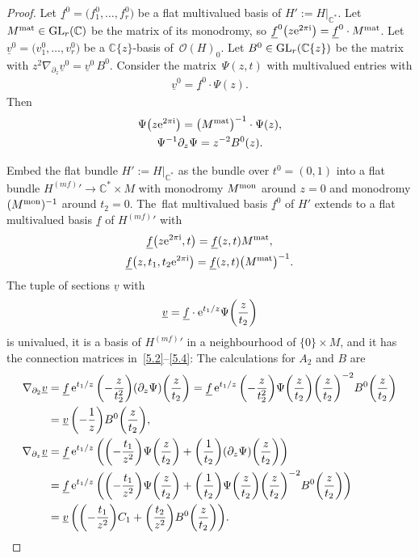 \documentclass[pdftex]{sigma}%
\numberwithin{equation}{section}
\numberwithin{figure}{section}
\newcommand{\C}{{\mathbb C}}
\newcommand{\OO}{{\mathcal O}}
\newcommand{\uuuu}{\underline}
\newcommand{\paa}{\partial}
\newcommand{\nnn}{\nabla}
\begin{document}
\begin{proof}
Let $\uuuu{f}^0=\big(f_1^0,\dots ,f_r^0\big)$ be a flat multivalued basis
of $H':=H|_{\C^*}$. Let $M^{\rm mat}\in {\rm GL}_r(\C)$
be the matrix of its monodromy, so
$\uuuu{f}^0\big(z {\rm e}^{2\pi {\rm i}}\big)=\uuuu{f}^0\cdot M^{\rm mat}$.
Let $\uuuu{v}^0=\big(v_1^0,\dots ,v_r^0\big)$ be a $\C\{z\}$-basis
of~$\OO(H)_0$. Let $B^0\in {\rm GL}_r(\C\{z\})$ be the matrix
with $z^2\nnn_{\paa_z}\uuuu{v}^0=\uuuu{v}^0\, B^0$.
Consider the mat\-rix~$\Psi(z,t)$ with multivalued entries with
\begin{gather*}%
\uuuu{v}^0=\uuuu{f}^0\cdot \Psi(z).
\end{gather*}
Then
\begin{gather*}%
\Psi\big(z{\rm e}^{2\pi {\rm i}}\big)= \big(M^{\rm mat}\big)^{-1}\cdot\Psi(z),
\\
\Psi^{-1}\paa_z \Psi = z^{-2}B^0(z).%
\end{gather*}

Embed the flat bundle $H':=H|_{\C^*}$ as the bundle
over $t^0=(0,1)$ into a flat bundle
${H^{(mf)}}'\to\C^*\times M$ with monodromy $M^{\rm mon}$
around $z=0$ and monodromy $(M^{\rm mon})^{-1}$ around
$t_2=0$. The~flat multivalued basis $\uuuu{f}^0$ of $H'$ extends
to a flat multivalued basis $\uuuu{f}$ of ${H^{(mf)}}'$ with
\begin{gather*}%
\uuuu{f}\big(z{\rm e}^{2\pi {\rm i}},t\big)=\uuuu{f}(z,t)M^{\rm mat},
\\
\uuuu{f}\big(z,t_1,t_2{\rm e}^{2\pi {\rm i}}\big)=\uuuu{f}(z,t)\big(M^{\rm mat}\big)^{-1}.
\label{5.9}
\end{gather*}
The tuple of sections $\uuuu{v}$ with
\begin{gather*}%
\uuuu{v}= \uuuu{f}\cdot {\rm e}^{t_1/z}\Psi\bigg(\frac{z}{t_2}\bigg)
\end{gather*}
is univalued, it is a basis of ${H^{(mf)}}'$ in a neighbourhood
of $\{0\}\times M$, and it has the connection matrices
in~\eqref{5.2}--\eqref{5.4}: The calculations for $A_2$
and $B$ are
\begin{align*}
\nnn_{\paa_2}\uuuu{v}&= \uuuu{f}\, {\rm e}^{t_1/z}\,
\bigg({-}\frac{z}{t_2^2}\bigg)(\paa_z\Psi)\bigg(\frac{z}{t_2}\bigg) = \uuuu{f}\, {\rm e}^{t_1/z}\, \bigg({-}\frac{z}{t_2^2}\bigg)
\Psi\bigg(\frac{z}{t_2}\bigg)\bigg(\frac{z}{t_2}\bigg)^{-2}B^0\bigg(\frac{z}{t_2}\bigg)\\
&=\uuuu{v}\, \bigg({-}\frac{1}{z}\bigg)B^0\bigg(\frac{z}{t_2}\bigg),
\\
\nnn_{\paa_z}\uuuu{v}
&= \uuuu{f}\, {\rm e}^{t_1/z}\,
\bigg(\bigg({-}\frac{t_1}{z^2}\bigg)\Psi\bigg(\frac{z}{t_2}\bigg)+ \bigg(\frac1{t_2}\bigg)(\paa_z\Psi)\bigg(\frac{z}{t_2}\bigg)\bigg)\\
&= \uuuu{f}\, {\rm e}^{t_1/z}\, \bigg(\bigg({-}\frac{t_1}{z^2}\bigg)\Psi\bigg(\frac{z}{t_2}\bigg)+ \bigg(\frac1{t_2}\bigg)
\Psi\bigg(\frac{z}{t_2}\bigg)\bigg(\frac{z}{t_2}\bigg)^{-2}B^0\bigg(\frac{z}{t_2}\bigg)\bigg)
\\
&=\uuuu{v}\, \bigg(\bigg({-}\frac{t_1}{z^2}\bigg)C_1+\bigg(\frac{t_2}{z^2}\bigg) B^0\bigg(\frac{z}{t_2}\bigg)\bigg).
\end{align*}


\end{proof}
\end{document}
